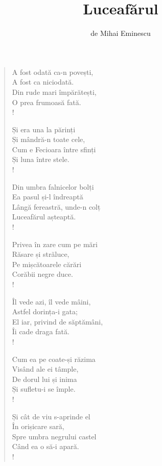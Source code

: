 \documentclass{article}
\title{Luceafărul}
\author{de Mihai Eminescu}
\date{}
\begin{document}
\maketitle

\iffalse
\settowidth{\versewidth}{- Dar nici nu știu măcar ce-mi ceri}
\setlength{\columnsep}{0cm}
\begin{small}
\begin{multicols}{3}
\begin{verse}
A fost odată ca-n povești, \\
A fost ca niciodată. \\
Din rude mari împărătești, \\
O prea frumoasă fată. \\!

Și era una la părinți \\
Și mândră-n toate cele, \\
Cum e Fecioara între sfinți \\
Și luna între stele. \\!

Din umbra falnicelor bolți \\
Ea pasul și-l îndreaptă \\
Lângă fereastră, unde-n colț \\
Luceafărul așteaptă. \\!

Privea în zare cum pe mări \\
Răsare și străluce, \\
Pe mișcătoarele cărări \\
Corăbii negre duce. \\!

Îl vede azi, îl vede mâini, \\
Astfel dorința-i gata; \\
El iar, privind de săptămâni, \\
Îi cade draga fată. \\!

Cum ea pe coate-și răzima \\
Visând ale ei tâmple, \\
De dorul lui și inima \\
Și sufletu-i se împle. \\!

Și cât de viu s-aprinde el \\
În orișicare sară, \\
Spre umbra negrului castel \\
Când ea o să-i apară. \\!


\end{verse}
\end{multicols}
\end{small}
\end{document}
